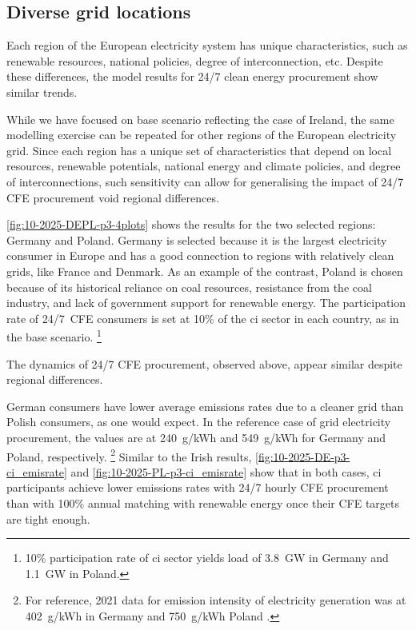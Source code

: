 \subsection{Diverse grid locations}
\label{subsec:location}

\vspace{10pt}
\begin{res}
    Each region of the European electricity system has unique characteristics, such as renewable resources, national policies, degree of interconnection, etc.
    Despite these differences, the model results for 24/7 clean energy procurement show similar trends. 
\end{res}

While we have focused on base scenario reflecting the case of Ireland, the same modelling exercise can be repeated for other regions of the European electricity grid.
Since each region has a unique set of characteristics that depend on local resources, renewable potentials, national energy and climate policies, and degree of interconnections, such sensitivity can allow for generalising the impact of 24/7 CFE procurement void regional differences.

\cref{fig:10-2025-DEPL-p3-4plots} shows the results for the two selected regions: Germany and Poland. 
Germany is selected because it is the largest electricity consumer in Europe and has a good connection to regions with relatively clean grids, like France and Denmark. 
As an example of the contrast, Poland is chosen because of its historical reliance on coal resources, resistance from the coal industry, and lack of government support for renewable energy.
The participation rate of 24/7~CFE consumers is set at 10\% of the \gls{ci} sector in each country, as in the base scenario.%
\footnote{10\% participation rate of \gls{ci} sector yields load of 3.8~GW in Germany and 1.1~GW in Poland.}

The dynamics of 24/7 CFE procurement, observed above, appear similar despite regional differences.

German consumers have lower average emissions rates due to a cleaner grid than Polish consumers, as one would expect.
In the reference case of grid electricity procurement, the values are at 240~g\co/kWh and 549~g\co/kWh for Germany and Poland, respectively.%
\footnote{For reference, 2021 data for emission intensity of electricity generation was at 402~g\co/kWh in Germany and 750~g\co/kWh Poland \cite{EEA-europa-web}.}
Similar to the Irish results, \cref{fig:10-2025-DE-p3-ci_emisrate} and \cref{fig:10-2025-PL-p3-ci_emisrate} show that in both cases, \gls{ci} participants achieve lower emissions rates with 24/7 hourly CFE procurement than with 100\% annual matching with renewable energy once their CFE targets are tight enough. 

